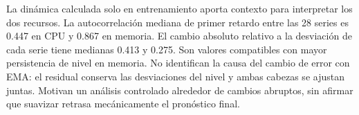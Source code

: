 La dinámica calculada solo en entrenamiento aporta contexto para interpretar los dos recursos. La autocorrelación mediana de primer retardo entre las 28 series es 0.447 en CPU y 0.867 en memoria. El cambio absoluto relativo a la desviación de cada serie tiene medianas 0.413 y 0.275. Son valores compatibles con mayor persistencia de nivel en memoria. No identifican la causa del cambio de error con EMA: el residual conserva las desviaciones del nivel y ambas cabezas se ajustan juntas. Motivan un análisis controlado alrededor de cambios abruptos, sin afirmar que suavizar retrasa mecánicamente el pronóstico final.
